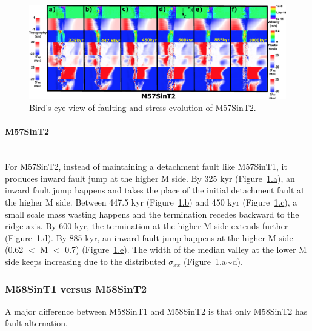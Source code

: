 \begin{figure}[h]
 \centering
  \includegraphics[width=1.0\textwidth]{./Figures/fig_Results_Weakening_4_M57SinT2_time_evolution.eps}
 \caption{Bird's-eye view of faulting and stress evolution of M57SinT2.}
\label{fig_Results_Weakenging_4}
\end{figure}

\paragraph{M57SinT2}\label{para_M57SinT2}
~\\
For M57SinT2, instead of maintaining a detachment fault like M57SinT1, it produces inward fault jump at the higher M side. By 325 kyr (Figure~\hyperref[fig_Results_Weakenging_4]{\ref{fig_Results_Weakenging_4}.a}), an inward fault jump happens and takes the place of the initial detachment fault at the higher M side. Between 447.5 kyr (Figure~\hyperref[fig_Results_Weakenging_4]{\ref{fig_Results_Weakenging_4}.b}) and 450 kyr (Figure~\hyperref[fig_Results_Weakenging_4]{\ref{fig_Results_Weakenging_4}.c}), a small scale mass wasting happens and the termination recedes backward to the ridge axis. By 600 kyr, the termination at the higher M side extends further (Figure~\hyperref[fig_Results_Weakenging_4]{\ref{fig_Results_Weakenging_4}.d}). By 885 kyr, an inward fault jump happens at the higher M side (0.62 $<$ M $<$ 0.7) (Figure~\hyperref[fig_Results_Weakenging_4]{\ref{fig_Results_Weakenging_4}.e}). The width of the median valley at the lower M side keeps increasing due to the distributed $\sigma_{xx}$ (Figure~\hyperref[fig_Results_Weakenging_4]{\ref{fig_Results_Weakenging_4}.a$\sim$d}).

\subsubsection{M58SinT1 versus M58SinT2}

A major difference between M58SinT1 and M58SinT2 is that only M58SinT2 has fault alternation.

